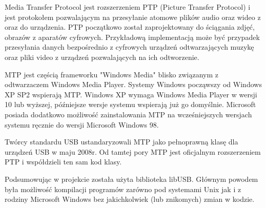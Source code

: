 \documentclass{BscUS}
\begin{document}
Media Transfer Protocol jest rozszerzeniem PTP (Picture Transfer Protocol) i jest protokołem pozwalającym na przesyłanie atomowe plików audio oraz wideo z oraz do urządzenia. PTP początkowo został zaprojektowany do ściągania zdjęć, obrazów z aparatów cyfrowych. Przykładową implementacją może być przypadek przesyłania danych bezpośrednio z cyfrowych urządzeń odtwarzających muzykę oraz pliki video z urządzeń pozwalających na ich odtworzenie.

MTP jest częścią frameworku "Windows Media" blisko związanym z odtwarzaczem Windows Media Player. Systemy Windows począwszy od Windows XP SP2 wspierają MTP. Windows XP wymaga Windows Media Player w wersji 10 lub wyższej, późniejsze wersje systemu wspierają już go domyślnie. Microsoft posiada dodatkowo możliwość zainstalowania MTP na wcześniejszych wersjach systemu ręcznie do wersji Microsoft Windows 98.

Twórcy standardu USB ustandaryzowali MTP jako pełnoprawną klasę dla urządzeń USB w maju 2008r.
Od tamtej pory MTP jest oficjalnym rozszerzeniem PTP i współdzieli ten sam kod klasy. \cite{winusbDesc, micrDevAppUSBDev, micrAccUsbDev, micCommWithUsb}
\newline

\indent Podsumowując w projekcie została użyta biblioteka libUSB. Głównym powodem była możliwość kompilacji programów zarówno pod systemami Unix jak i z rodziny Microsoft Windows bez jakichkolwiek (lub znikomych) zmian w kodzie.
\end{document}
